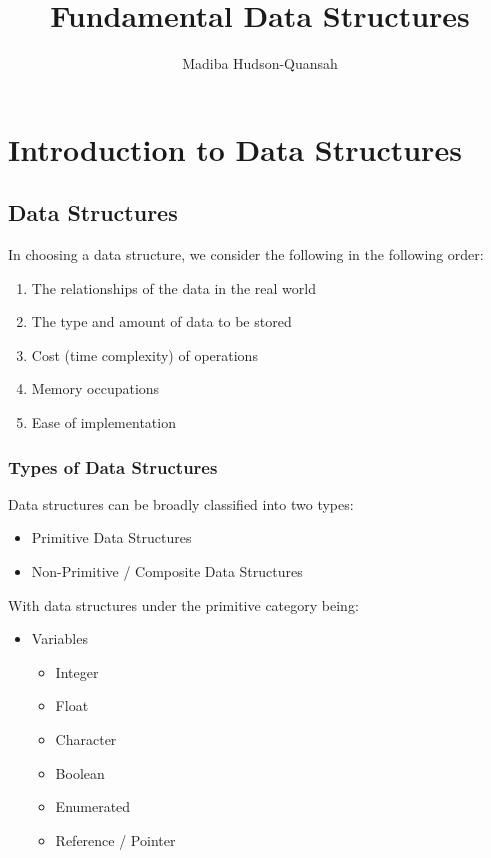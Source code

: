 \documentclass[12pt letter]{report}
\title{\Huge{Fundamental Data Structures}}
\author{\huge{Madiba Hudson-Quansah}}
\date{}
\begin{document}
\maketitle
\newpage
{}
\tableofcontents
\pagebreak

\chapter{Introduction to Data Structures}

\section{Data Structures}




In choosing a data structure, we consider the following in the following order:
\begin{enumerate}
  \item The relationships of the data in the real world
  \item The type and amount of data to be stored
  \item Cost (time complexity) of operations
  \item Memory occupations
  \item Ease of implementation
\end{enumerate}

\subsection{Types of Data Structures}

Data structures can be broadly classified into two types:
\begin{itemize}
  \item Primitive Data Structures
  \item Non-Primitive / Composite Data Structures
\end{itemize}

With data structures under the primitive category being:
\begin{itemize}
  \item Variables
        \begin{itemize}
          \item Integer
          \item Float
          \item Character
          \item Boolean
          \item Enumerated
          \item Reference / Pointer
        \end{itemize}
\end{itemize}
\end{document}
